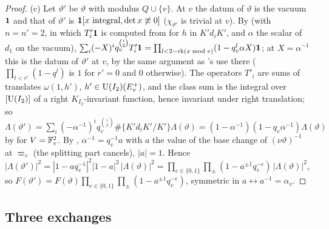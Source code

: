 \documentclass[10pt]{amsart}
\theoremstyle{definition}
\theoremstyle{remark}
\providecommand{\psHS}{\mathcal H}
\providecommand{\psvac}{\mathbf v}
\begin{document}
\begin{proof}
(c) Let $\vartheta'$ be $\vartheta$ with modulus $Q\cup\{v\}$. At $v$ the datum of $\vartheta$ is the
vacuum $\plone$ and that of $\vartheta'$ is $\plone[x\text{ integral},\det x\not\equiv0]$ ($\chi_{\vartheta'}$
is trivial at $v$). By {\cite[Lemma~6.8]{P49}} (with $n=n'=2$, in which $T'_i\plone$ is computed from
{\cite[(62)]{P49}} for $h$ in $K'd_iK'$, and $\alpha$ the scalar of $d_1$ on the vacuum),
$\sum_{i}(-X)^iq_v^{\binom i2}T'_i\plone=\prod_{l<2-\mathrm{rk}(x\bmod v)}(1-q_v^l\alpha X)\plone$; at
$X=\alpha^{-1}$ this is the datum of $\vartheta'$ at $v$, by the same argument as
{\cite[(65)]{P49}}'s use there ($\prod_{l<r'}(1-q^l)$ is $1$ for $r'=0$ and $0$ otherwise). The operators
$T'_i$ are sums of translates $\omega(1,h')$, $h'\in\auU(I_2)(E^+_v)$, and the class sum is the integral over
$[\auU(I_2)]$ of a right $K_{I_2}$-invariant function, hence invariant under right translation; so
$\Lambda(\vartheta')=\sum_i(-\alpha^{-1})^iq_v^{\binom i2}\#\{K'd_iK'/K'\}\Lambda(\vartheta)=(1-\alpha^{-1})
(1-q_v\alpha^{-1})\Lambda(\vartheta)$ by {\cite[(65)]{P49}} for $V=\auF_v^2$. By {\cite[(62)]{P49}},
$\alpha^{-1}=q_v^{-1}a$ with $a$ the value of the base change of $(\nu\vartheta)^{-1}$ at $\varpi_v$ (the
splitting part cancels), $|a|=1$. Hence $|\Lambda(\vartheta')|^2=|1-aq_v^{-1}|^2|1-a|^2\,|\Lambda(\vartheta)|^2=\prod_{e\in\{0,1\}}
\prod_\pm(1-a^{\pm1}q_v^{-e})\,|\Lambda(\vartheta)|^2$, so $F(\vartheta')=F(\vartheta)\prod_{e\in\{0,1\}}\prod_\pm(1-a^{\pm1}q_v^{-e})$, symmetric in $a\leftrightarrow a^{-1}=\alpha_v$.
\end{proof}




\providecommand{\auO}{\mathcal O}
\providecommand{\auU}{\mathrm U}
\providecommand{\auGL}{\mathrm{GL}}
\providecommand{\auHom}{\operatorname{Hom}}
\providecommand{\auNm}{\operatorname{Nm}}
\providecommand{\auA}{\mathbb A}
\providecommand{\auF}{\mathbb F}
\providecommand{\auPl}{\Phi}
\providecommand{\aubar}[1]{\overline{#1}}
\providecommand{\plone}{\mathbf 1}
\providecommand{\pop}{\mathsf p}
\providecommand{\pcR}{R}
\providecommand{\pcm}{\mathfrak m}
\providecommand{\pcMat}{\mathrm M}
\providecommand{\psvac}{{\phi^{\mathrm{vac}}}}
\providecommand{\psZ}{Z}
\providecommand{\psrho}{\varrho}
\providecommand{\psHS}{\mathcal H}
\providecommand{\poA}{\mathcal A}
\providecommand{\pog}{\mathsf g}
\providecommand{\pteSD}{\mathrm{SD}}
\providecommand{\pteMP}{\mathrm{MP}}
\providecommand{\pteCS}{\mathop{\textstyle\sum^{\mathrm{cl}}}}
\providecommand{\ptetr}{\operatorname{tr}}

\subsection{Three exchanges}\label{pte:sec}
\end{document}
